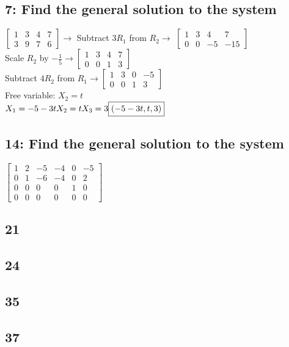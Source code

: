 \documentclass{article}
\begin{document}
\subsection*{7: Find the general solution to the system}
$
\left[\begin{array}{ccc|c}
    1 & 3 & 4 & 7 \\
    3 & 9 & 7 & 6
\end{array}\right]
\rightarrow$ Subtract $3R_1$ from $R_2 \rightarrow$
$
\left[\begin{array}{ccc|c}
    1 & 3 & 4 & 7 \\
    0 & 0 & -5 & -15
\end{array}\right]$ \\[0.1in] Scale $R_2$ by $-\frac{1}{5} \rightarrow
\left[\begin{array}{ccc|c}
    1 & 3 & 4 & 7 \\
    0 & 0 & 1 & 3
\end{array}\right]
$\\[0.1in] Subtract $4R_2$ from $R_1 \rightarrow
\left[\begin{array}{ccc|c}
    1 & 3 & 0 & -5 \\
    0 & 0 & 1 & 3
\end{array}\right]
$ \\[0.1in] Free variable: $X_2 = t$
\\$X_1=-5-3t \\ X_2 = t \\ X_3=3 \\ \boxed{(-5-3t, t, 3)}$ 
\subsection*{14: Find the general solution to the system}
$\left[\begin{array}{ccccc|c}
    1 & 2 & -5 & -4 & 0 & -5 \\
    0 & 1 & -6 & -4 & 0 & 2 \\
    0 & 0 & 0 & 0 & 1 & 0 \\
    0 & 0 & 0 & 0 & 0 & 0 
\end{array}\right]$
\subsection*{21}
\subsection*{24}
\subsection*{35}
\subsection*{37}
\end{document}
